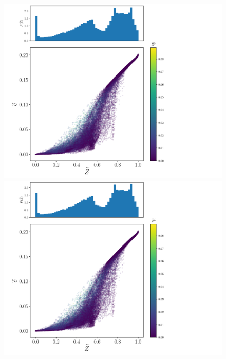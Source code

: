 \documentclass[xcolor=dvipsnames]{beamer}
\begin{document}
{\begin{figure}[!tbp]
    \includegraphics[page=2, height=0.3\textwidth, trim=1.0cm 0cm 2.4cm 0cm, clip]{./figs/inputs_dice_0007.pdf}%
    \includegraphics[page=3, height=0.3\textwidth, trim=0.0cm 0cm 2.4cm 0cm, clip]{./figs/inputs_dice_0007.pdf}%
  \end{figure}%
}
\end{document}
